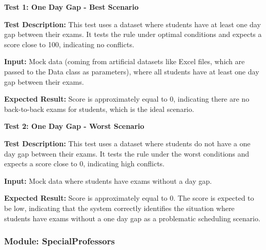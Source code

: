  
 \textbf{Test 1: One Day Gap - Best Scenario}


\vspace{\baselineskip}

 
 \textbf{Test Description:}
 This test uses a dataset where students have at least one day gap between
their exams. It tests the rule under optimal conditions and expects a score close to 100, indicating
no conflicts.
\vspace{\baselineskip}


 \textbf{Input:}
Mock data (coming from artificial datasets like Excel files, which are passed to the Data
class as parameters), where all students have at least one day gap between their exams.

\vspace{\baselineskip}

 
 \textbf{Expected Result:}
Score is approximately equal to 0, indicating there are no back-to-back exams
for students, which is the ideal scenario.


\vspace{\baselineskip}

 
 \textbf{Test 2: One Day Gap - Worst Scenario}


\vspace{\baselineskip}

 
 \textbf{Test Description:}
This test uses a dataset where students do not have a one day gap between
their exams. It tests the rule under the worst conditions and expects a score close to 0, indicating
high conflicts.

\vspace{\baselineskip}


 \textbf{Input:}
 Mock data where students have exams without a day gap.
 
\vspace{\baselineskip}

 
 \textbf{Expected Result:}
Score is approximately equal to 0. The score is expected to be low, indicating
that the system correctly identifies the situation where students have exams without a one day
gap as a problematic scheduling scenario.


\vspace{\baselineskip}




 \subsubsection{Module: SpecialProfessors}

